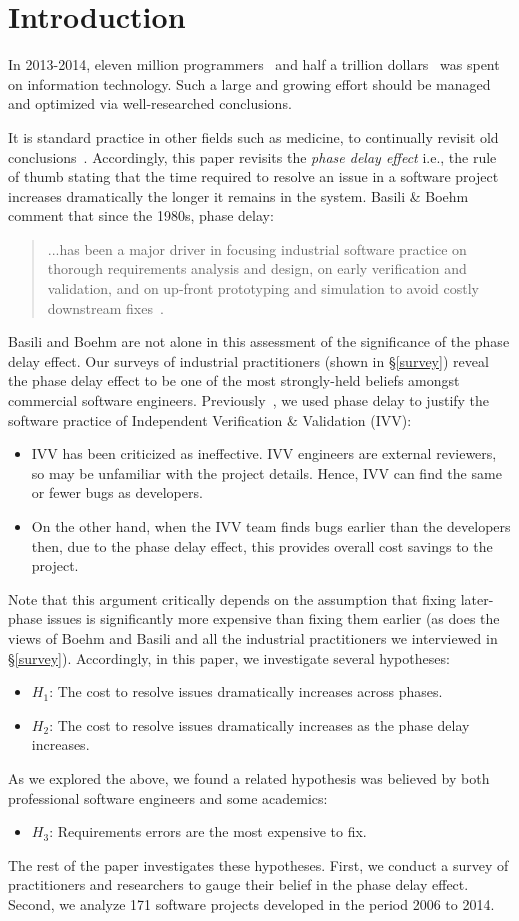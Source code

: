 \documentclass{sig-alternate}
\newcommand{\bi}{\begin{itemize}}%
\newcommand{\ei}{\end{itemize}}
\begin{document}
\section{Introduction}
In 2013-2014, 
eleven  million programmers~\cite{pettey14} and
half a trillion dollars~\cite{avram14} was spent on information technology.
Such a large and growing effort should be managed and optimized via  well-researched conclusions.  

It is standard practice
in other fields such as medicine,
to continually revisit old conclusions~\cite{prasad13}.
Accordingly, this paper revisits
the {\em phase delay effect}
i.e.,  the rule of thumb stating that the time required to resolve an issue in a software project increases dramatically 
the longer it remains in the system. Basili \& Boehm comment that since the 1980s,  phase delay:
\begin{quote}
...has been a major driver in focusing
industrial software practice on thorough
requirements analysis and design,
on early verification and validation, and
on up-front prototyping and simulation
to avoid costly downstream fixes~\cite{boehm01}.
\end{quote}
Basili and Boehm are not alone in this assessment of the significance of the phase delay effect. Our surveys of industrial practitioners (shown in \S\ref{survey}) reveal the phase delay effect to be
one of the most strongly-held beliefs amongst commercial software engineers.
Previously~\cite{me08a}, we used phase delay to justify the software practice
of 
Independent Verification \& Validation (IVV):
\bi
\item
IVV has been criticized as
ineffective. IVV engineers are external reviewers, so may be unfamiliar with the project details.
Hence,    IVV   can find the same or fewer bugs
as  developers.
\item
On the other hand,   when the IVV team finds bugs earlier than the developers then, due to the phase delay effect, this provides overall cost savings to the project. 
\ei
Note that this argument critically depends on the assumption that   fixing later-phase issues is  significantly more expensive than fixing them earlier (as does the views of Boehm and Basili and all the industrial practitioners
we interviewed in \S\ref{survey}). Accordingly, in this paper, we investigate several hypotheses:
\bi
    \item $H_1$: The cost to resolve issues dramatically increases across phases.
    \item $H_2$: The cost to resolve issues dramatically increases as the phase delay increases.
\ei
As we explored the above, we found a related hypothesis was believed by both professional software engineers and some academics:
\bi
 \item $H_3$: Requirements errors are the most expensive to fix.
\ei
The rest of the paper investigates these  hypotheses. First, we conduct a survey of practitioners and researchers to gauge their belief in the phase delay effect. Second, we  analyze 171 software  projects developed in the period 2006 to 2014.  
\end{document}
